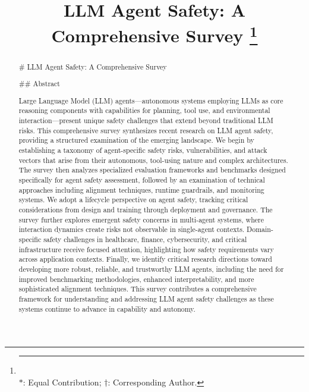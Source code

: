 \documentclass[conference]{IEEEtran}
\begin{document}
\title{LLM Agent Safety: A Comprehensive Survey
%
\thanks{\hspace*{-\parindent}\rule{3.8cm}{0.4pt} \\
$\ast$: Equal Contribution;  $\dagger$: Corresponding Author.}
}

\author{
\and
{}
}

\maketitle

\begin{abstract}
# LLM Agent Safety: A Comprehensive Survey

## Abstract

Large Language Model (LLM) agents—autonomous systems employing LLMs as core reasoning components with capabilities for planning, tool use, and environmental interaction—present unique safety challenges that extend beyond traditional LLM risks. This comprehensive survey synthesizes recent research on LLM agent safety, providing a structured examination of the emerging landscape. We begin by establishing a taxonomy of agent-specific safety risks, vulnerabilities, and attack vectors that arise from their autonomous, tool-using nature and complex architectures. The survey then analyzes specialized evaluation frameworks and benchmarks designed specifically for agent safety assessment, followed by an examination of technical approaches including alignment techniques, runtime guardrails, and monitoring systems. We adopt a lifecycle perspective on agent safety, tracking critical considerations from design and training through deployment and governance. The survey further explores emergent safety concerns in multi-agent systems, where interaction dynamics create risks not observable in single-agent contexts. Domain-specific safety challenges in healthcare, finance, cybersecurity, and critical infrastructure receive focused attention, highlighting how safety requirements vary across application contexts. Finally, we identify critical research directions toward developing more robust, reliable, and trustworthy LLM agents, including the need for improved benchmarking methodologies, enhanced interpretability, and more sophisticated alignment techniques. This survey contributes a comprehensive framework for understanding and addressing LLM agent safety challenges as these systems continue to advance in capability and autonomy.
\end{abstract}
\end{document}
